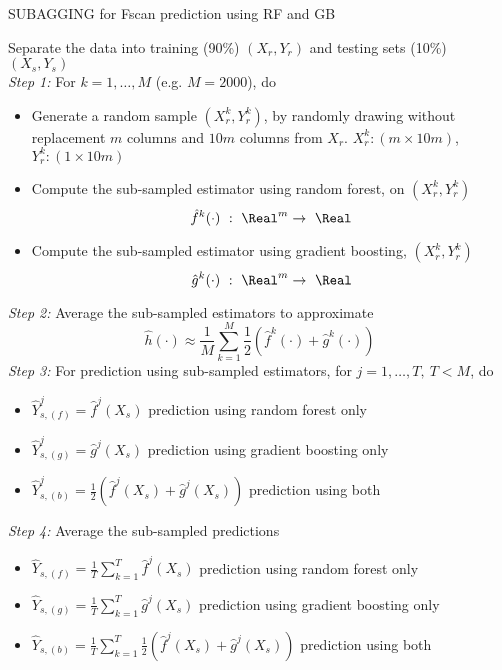 \begin{algorithm}[H]
\caption{SUBAGGING for Fscan prediction using RF and GB}
Separate the data into training (90\%) $(X_{r}, Y_{r})$ and testing sets (10\%) $(X_{s}, Y_{s})$\\
{\emph{Step 1:}} For $k = 1,\dots, M$ (e.g. $M = 2000$), do
\begin{itemize}
\item Generate a random sample $(X_r^{k}, Y_r^{k})$, by randomly drawing without replacement $m$ columns and $10m$ columns from $X_r$. $X_r^k: (m \times 10m)$,  $Y_r^k: (1 \times 10m)$
\item Compute the sub-sampled estimator using random forest, on $(X_r^{k}, Y_r^{k})$
\[ \hat{f}^k(\cdot) \ :\ \Real ^m \rightarrow \ \Real \]
\item Compute the sub-sampled estimator using gradient boosting, $(X_r^{k}, Y_r^{k})$
\[ \hat{g}^k(\cdot) \ :\ \Real ^m \rightarrow \ \Real \]
\end{itemize}
{\emph{Step 2:}} Average the sub-sampled estimators to approximate
\[ \hat{h}(\cdot) \approx \frac{1}{M} \sum\limits_{k = 1}^{M} \frac{1}{2} \left ( \hat{f}^k(\cdot) + \hat{g}^k(\cdot) \right ) \]
{\emph{Step 3:}} For prediction using sub-sampled estimators, for $j = 1, \dots, T, \ T < M$, do
\begin{itemize}
\item $\hat{Y}_{s,(f)}^j = \hat{f}^j(X_s)$ prediction using random forest only
\item $\hat{Y}_{s,(g)}^j = \hat{g}^j(X_s)$ prediction using gradient boosting only
\item $\hat{Y}_{s,(b)}^j = \frac{1}{2} \left( \hat{f}^j(X_s) + \hat{g}^j(X_s) \right)$ prediction using both
\end{itemize}
{\emph{Step 4:}} Average the sub-sampled predictions
\begin{itemize}
\item $\hat{Y}_{s,(f)} = \frac{1}{T} \sum\limits_{k = 1}^{T}\hat{f}^j(X_s)$ prediction using random forest only
\item $\hat{Y}_{s,(g)} = \frac{1}{T} \sum\limits_{k = 1}^{T}\hat{g}^j(X_s)$ prediction using gradient boosting only
\item $\hat{Y}_{s,(b)} = \frac{1}{T} \sum\limits_{k = 1}^{T} \frac{1}{2} \left( \hat{f}^j(X_s) + \hat{g}^j(X_s) \right)$ prediction using both
\end{itemize}

\label{Algo}
\end{algorithm}



